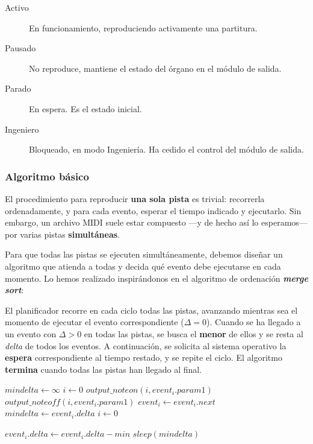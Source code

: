 \smallskip

\begin{description}
	\item[Activo] En funcionamiento, reproduciendo activamente una partitura.
	\item[Pausado] No reproduce, mantiene el estado del órgano en el módulo de salida.
	\item[Parado] En espera. Es el estado inicial.
	\item[Ingeniero] Bloqueado, en modo Ingeniería. Ha cedido el control del módulo de salida.
\end{description}

\subsubsection{Algoritmo básico}

El procedimiento para reproducir \textbf{una sola pista} es trivial: recorrerla ordenadamente, y para cada evento, esperar el tiempo indicado y ejecutarlo. Sin embargo, un archivo \acrshort{MIDI} suele estar compuesto ---y de hecho así lo esperamos--- por varias pistas \textbf{simultáneas}.

Para que todas las pistas se ejecuten simultáneamente, debemos diseñar un algoritmo que atienda a todas y decida qué evento debe ejecutarse en cada momento. Lo hemos realizado inspirándonos en el algoritmo de ordenación \textbf{\textit{merge sort}}:

El planificador recorre en cada ciclo todas las pistas, avanzando mientras sea el momento de ejecutar el evento correspondiente ($\Delta=0$). Cuando se ha llegado a un evento con $\Delta > 0$ en todas las pistas, se busca el \textbf{menor} de ellos y se resta al \textit{delta} de todos los eventos. A continuación, se solicita al sistema operativo la \textbf{espera} correspondiente al tiempo restado, y se repite el ciclo. El algoritmo \textbf{termina} cuando todas las pistas han llegado al final.

\smallskip

\begin{algorithmic}
	\LOOP
		\STATE $mindelta \gets \infty$
		\STATE $i\gets 0$
					\STATE $output\_noteon(i, event_i.param1)$
				\ELSE 
						\STATE $output\_noteoff (i, event_i.param1)$
					\ENDIF
				\ENDIF
				\STATE $event_i \gets event_i.next$
			\ENDWHILE
				\STATE $mindelta \gets event_i.delta$
			\ENDIF
		\ENDWHILE
		\STATE $i \gets 0$
		
			\STATE $event_i.delta \gets event_i.delta - min$
		\ENDWHILE
		\STATE $sleep (mindelta)$
	\ENDLOOP
\end{algorithmic}

